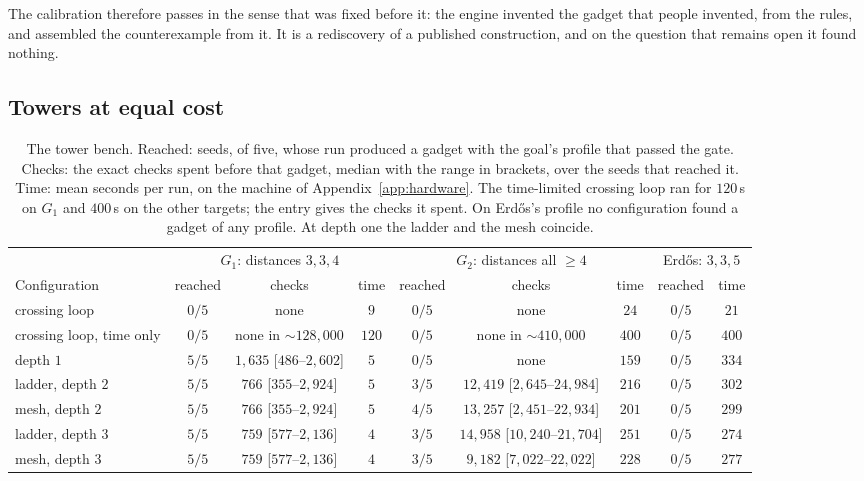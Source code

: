 The calibration therefore passes in the sense that was fixed before it: the engine invented the gadget that people invented, from the rules, and assembled the counterexample from it. It is a rediscovery of a published construction, and on the question that remains open it found nothing.

\subsection{Towers at equal cost}\label{ssec:towerbench}

\begin{table}[t]
\caption{The tower bench. Reached: seeds, of five, whose run produced a gadget with the goal's profile that passed the gate. Checks: the exact checks spent before that gadget, median with the range in brackets, over the seeds that reached it. Time: mean seconds per run, on the machine of Appendix~\ref{app:hardware}. The time-limited crossing loop ran for $120$\,s on $G_{1}$ and $400$\,s on the other targets; the entry gives the checks it spent. On Erd\H{o}s's profile no configuration found a gadget of any profile. At depth one the ladder and the mesh coincide.}
\label{tab:towerbench}
\centering
\footnotesize
\setlength{\tabcolsep}{3.2pt}
\begin{tabular}{@{}lcccccccc@{}}
\toprule
 & \multicolumn{3}{c}{$G_{1}$: distances $3,3,4$} & \multicolumn{3}{c}{$G_{2}$: distances all $\ge4$} & \multicolumn{2}{c}{Erd\H{o}s: $3,3,5$} \\
\cmidrule(lr){2-4}\cmidrule(lr){5-7}\cmidrule(l){8-9}
Configuration & reached & checks & time & reached & checks & time & reached & time \\
\midrule
crossing loop & $0/5$ & none & $9$ & $0/5$ & none & $24$ & $0/5$ & $21$ \\
crossing loop, time only & $0/5$ & none in ${\sim}128{,}000$ & $120$ & $0/5$ & none in ${\sim}410{,}000$ & $400$ & $0/5$ & $400$ \\
depth $1$ & $5/5$ & $1{,}635$ [$486$--$2{,}602$] & $5$ & $0/5$ & none & $159$ & $0/5$ & $334$ \\
ladder, depth $2$ & $5/5$ & $766$ [$355$--$2{,}924$] & $5$ & $3/5$ & $12{,}419$ [$2{,}645$--$24{,}984$] & $216$ & $0/5$ & $302$ \\
mesh, depth $2$ & $5/5$ & $766$ [$355$--$2{,}924$] & $5$ & $4/5$ & $13{,}257$ [$2{,}451$--$22{,}934$] & $201$ & $0/5$ & $299$ \\
ladder, depth $3$ & $5/5$ & $759$ [$577$--$2{,}136$] & $4$ & $3/5$ & $14{,}958$ [$10{,}240$--$21{,}704$] & $251$ & $0/5$ & $274$ \\
mesh, depth $3$ & $5/5$ & $759$ [$577$--$2{,}136$] & $4$ & $3/5$ & $9{,}182$ [$7{,}022$--$22{,}022$] & $228$ & $0/5$ & $277$ \\
\bottomrule
\end{tabular}
\end{table}


